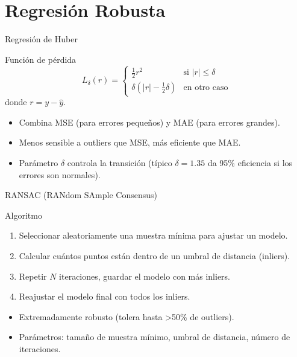 \documentclass[aspectratio=169, 10pt, xcolor=table]{beamer}
\begin{document}
\section{Regresión Robusta}

\begin{frame}{Regresión de Huber}
    \begin{block}{Función de pérdida}
        \[
        L_{\delta}(r) = 
        \begin{cases}
            \frac{1}{2}r^2 & \text{si } |r| \le \delta \\
            \delta(|r| - \frac{1}{2}\delta) & \text{en otro caso}
        \end{cases}
        \]
        donde $r = y - \hat{y}$.
    \end{block}
    \begin{itemize}
        \item Combina MSE (para errores pequeños) y MAE (para errores grandes).
        \item Menos sensible a outliers que MSE, más eficiente que MAE.
        \item Parámetro $\delta$ controla la transición (típico $\delta = 1.35$ da 95\% eficiencia si los errores son normales).
    \end{itemize}
\end{frame}

\begin{frame}{RANSAC (RANdom SAmple Consensus)}
    \begin{block}{Algoritmo}
        \begin{enumerate}
            \item Seleccionar aleatoriamente una muestra mínima para ajustar un modelo.
            \item Calcular cuántos puntos están dentro de un umbral de distancia (inliers).
            \item Repetir $N$ iteraciones, guardar el modelo con más inliers.
            \item Reajustar el modelo final con todos los inliers.
        \end{enumerate}
    \end{block}
    \begin{itemize}
        \item Extremadamente robusto (tolera hasta >50\% de outliers).
        \item Parámetros: tamaño de muestra mínimo, umbral de distancia, número de iteraciones.
    \end{itemize}
\end{frame}
\end{document}
